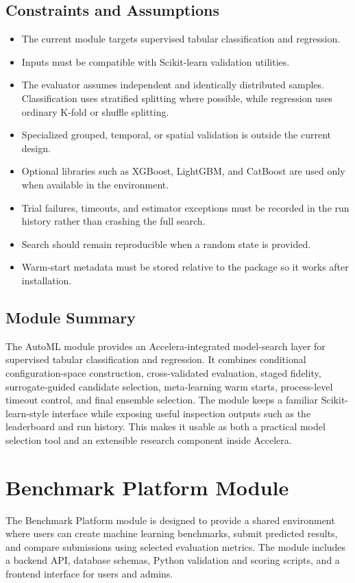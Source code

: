 \documentclass[12pt,a4paper]{report}
\begin{document}
\subsection{Constraints and Assumptions}

\begin{itemize}
  \item The current module targets supervised tabular classification and
  regression.
  \item Inputs must be compatible with Scikit-learn validation utilities.
  \item The evaluator assumes independent and identically distributed samples.
  Classification uses stratified splitting where possible, while regression uses
  ordinary K-fold or shuffle splitting.
  \item Specialized grouped, temporal, or spatial validation is outside the
  current design.
  \item Optional libraries such as XGBoost, LightGBM, and CatBoost are used only
  when available in the environment.
  \item Trial failures, timeouts, and estimator exceptions must be recorded in
  the run history rather than crashing the full search.
  \item Search should remain reproducible when a random state is provided.
  \item Warm-start metadata must be stored relative to the package so it works
  after installation.
\end{itemize}

\subsection{Module Summary}
\noindent The AutoML module provides an Accelera-integrated model-search layer for
supervised tabular classification and regression. It combines conditional
configuration-space construction, cross-validated evaluation, staged fidelity,
surrogate-guided candidate selection, meta-learning warm starts, process-level
timeout control, and final ensemble selection. The module keeps a familiar
Scikit-learn-style interface while exposing useful inspection outputs such as
the leaderboard and run history. This makes it usable as both a practical model
selection tool and an extensible research component inside Accelera.




\section{Benchmark Platform Module}
\noindent The Benchmark Platform module is designed to provide a shared
environment where users can create machine learning benchmarks, submit
predicted results, and compare submissions using selected evaluation metrics.
The module includes a backend API, database schemas, Python validation and
scoring scripts, and a frontend interface for users and admins.
\end{document}
